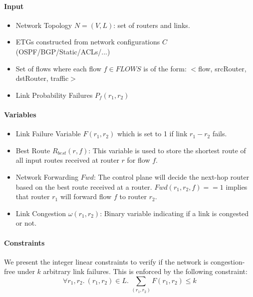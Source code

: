 \documentclass[]{article}
\begin{document}
\noindent\paragraph{Input}
\begin{itemize}
\item Network Topology $N = (V, L)$: set of routers and links. 
\item ETGs constructed from network configurations $C$ (OSPF/BGP/Static/ACLs/...)
\item Set of flows where 
each flow $f \in FLOWS$ is of the form: $<$flow, srcRouter, dstRouter, traffic$>$\
\item Link Probability Failures $P_f(r_1, r_2)$
\end{itemize}
\noindent\paragraph{Variables}
\begin{itemize}
\item Link Failure Variable $F(r_1, r_2)$ which is set to 1 if link $r_1 - r_2$ fails.

\item Best Route $R_{best}(r, f)$: This variable is used to store the shortest route  
of all input routes received at router $r$ for flow $f$.

\item Network Forwarding $Fwd$: The control plane will decide the next-hop 
router based on the best route received at a router.  
$Fwd(r_1, r_2, f)== 1$ implies that router $r_1$ will forward flow $f$ to router $r_2$.

\item Link Congestion $\omega(r_1, r_2)$: Binary variable indicating if a 
link is congested or not.  
\end{itemize}

\noindent\paragraph{Constraints}
We present the integer linear constraints to verify if the network 
is congestion-free under $k$ arbitrary link failures. This is 
enforced by the following constraint:
\begin{equation}
	\forall r_1, r_2.~(r_1,r_2) \in L. ~\sum_{(r_1, r_2)} F(r_1, r_2) \leq k
\end{equation}
\end{document}
